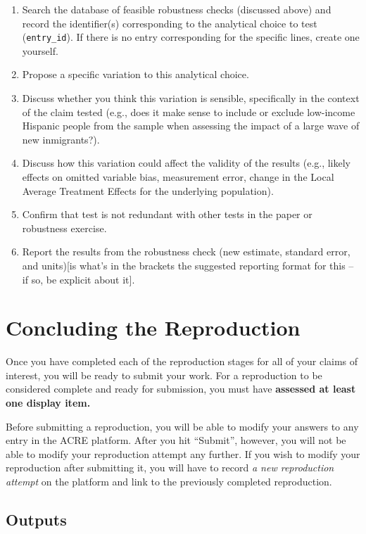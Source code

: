 \documentclass[
]{book}
\begin{document}
\begin{enumerate}
\def\labelenumi{\arabic{enumi}.}
\item
  Search the database of feasible robustness checks (discussed above) and record the identifier(s) corresponding to the analytical choice to test (\texttt{entry\_id}). If there is no entry corresponding for the specific lines, create one yourself.
\item
  Propose a specific variation to this analytical choice.
\item
  Discuss whether you think this variation is sensible, specifically in the context of the claim tested (e.g., does it make sense to include or exclude low-income Hispanic people from the sample when assessing the impact of a large wave of new inmigrants?).
\item
  Discuss how this variation could affect the validity of the results (e.g., likely effects on omitted variable bias, measurement error, change in the Local Average Treatment Effects for the underlying population).
\item
  Confirm that test is not redundant with other tests in the paper or robustness exercise.
\item
  Report the results from the robustness check (new estimate, standard error, and units){[}is what's in the brackets the suggested reporting format for this -- if so, be explicit about it{]}.
\end{enumerate}

\hypertarget{concluding-the-reproduction}{%
\chapter{Concluding the Reproduction}\label{concluding-the-reproduction}}

Once you have completed each of the reproduction stages for all of your claims of interest, you will be ready to submit your work. For a reproduction to be considered complete and ready for submission, you must have \textbf{assessed at least one display item.}

Before submitting a reproduction, you will be able to modify your answers to any entry in the ACRE platform. After you hit ``Submit'', however, you will not be able to modify your reproduction attempt any further. If you wish to modify your reproduction after submitting it, you will have to record \emph{a new reproduction attempt} on the platform and link to the previously completed reproduction.

\hypertarget{outputs}{%
\section{Outputs}\label{outputs}}
\end{document}
